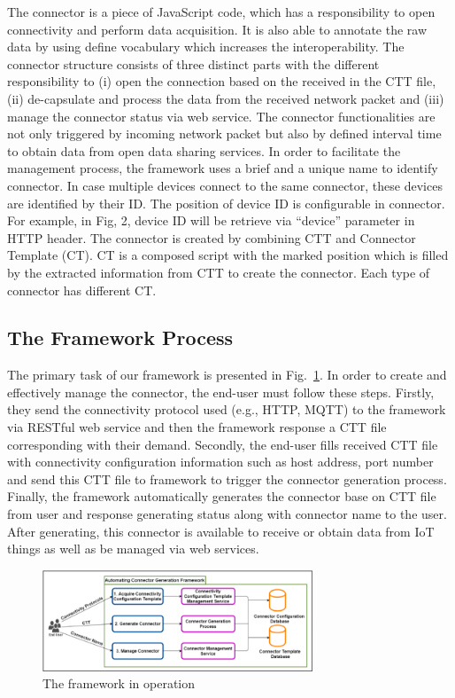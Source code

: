 The connector is a piece of JavaScript code, which has a responsibility to open connectivity and perform data acquisition. It is also able to annotate the raw data by using define vocabulary which increases the interoperability. The connector structure consists of three distinct parts with the different responsibility to (i) open the connection based on the received in the CTT file, (ii) de-capsulate and process the data from the received network packet and (iii) manage the connector status via web service. The connector functionalities are not only triggered by incoming network packet but also by defined interval time to obtain data from open data sharing services. In order to facilitate the management process, the framework uses a brief and a unique name to identify connector. In case multiple devices connect to the same connector, these devices are identified by their ID. The position of device ID is configurable in connector. For example, in Fig, 2, device ID will be retrieve via “device” parameter in HTTP header. The connector is created by combining CTT and Connector Template (CT). CT is a composed script with the marked position which is filled by the extracted information from CTT to create the connector. Each type of connector has different CT.

\subsection{The Framework Process}
The primary task of our framework is presented in Fig.~\ref{fig:c4_connector_general_operation}. In order to create and effectively manage the connector, the end-user must follow these steps. Firstly, they send the connectivity protocol used (e.g., HTTP, MQTT) to the framework via RESTful web service and then the framework response a CTT file corresponding with their demand. Secondly, the end-user fills received CTT file with connectivity configuration information such as host address, port number and send this CTT file to framework to trigger the connector generation process. Finally, the framework automatically generates the connector base on CTT file from user and response generating status along with connector name to the user. After generating, this connector is available to receive or obtain data from IoT things as well as be managed via web services.\\

\begin{figure}[h!] 
 \begin{center} 
 \includegraphics[width=0.72\textwidth]{./Part2/Chapter4/figures/connector_general_opereration.png} 
    \caption{The framework in operation}
     \label{fig:c4_connector_general_operation}
  \end{center} 
\end{figure}



